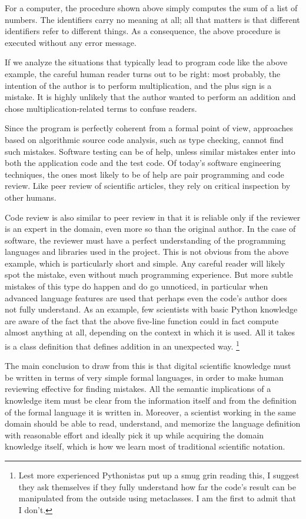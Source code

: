 For a computer, the procedure shown above simply computes the sum of a list of numbers. The identifiers carry no meaning at all; all that matters is that different identifiers refer to different things. As a consequence, the above procedure is executed without any error message.

If we analyze the situations that typically lead to program code like the above example, the careful human reader turns out to be right: most probably, the intention of the author is to perform multiplication, and the plus sign is a mistake. It is highly unlikely that the author wanted to perform an addition and chose multiplication-related terms to confuse readers.

Since the program is perfectly coherent from a formal point of view, approaches based on algorithmic source code analysis, such as type checking, cannot find such mistakes. Software testing can be of help, unless similar mistakes enter into both the application code and the test code. Of today's software engineering techniques, the ones most likely to be of help are pair programming and code review. Like peer review of scientific articles, they rely on critical inspection by other humans.

Code review is also similar to peer review in that it is reliable only if the reviewer is an expert in the domain, even more so than the original author. In the case of software, the reviewer must have a perfect understanding of the programming languages and libraries used in the project. This is not obvious from the above example, which is particularly short and simple. Any careful reader will likely spot the mistake, even without much programming experience. But more subtle mistakes of this type do happen and do go unnoticed, in particular when advanced language features are used that perhaps even the code's author does not fully understand. As an example, few scientists with basic Python knowledge are aware of the fact that the above five-line function could in fact compute almost anything at all, depending on the context in which it is used. All it takes is a class definition that defines addition in an unexpected way. \footnote{Lest more experienced Pythonistas put up a smug grin reading this, I suggest they ask themselves if they fully understand how far the code's result can be manipulated from the outside using metaclasses. I am the first to admit that I don't.}

The main conclusion to draw from this is that digital scientific knowledge must be written in terms of very simple formal languages, in order to make human reviewing effective for finding mistakes. All the semantic implications of a knowledge item must be clear from the information itself and from the definition of the formal language it is written in. Moreover, a scientist working in the same domain should be able to read, understand, and memorize the language definition with reasonable effort and ideally pick it up while acquiring the domain knowledge itself, which is how we learn most of traditional scientific notation.

